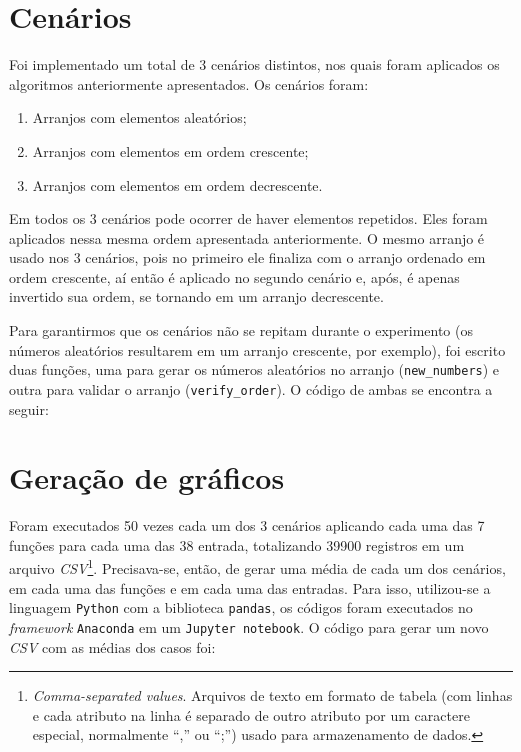 \section{Cenários}
Foi implementado um total de 3 cenários distintos, nos quais foram aplicados os algoritmos anteriormente apresentados. Os cenários foram:

\begin{enumerate}
	\item Arranjos com elementos aleatórios;
	\item Arranjos com elementos em ordem crescente;
	\item Arranjos com elementos em ordem decrescente.
\end{enumerate}

Em todos os 3 cenários pode ocorrer de haver elementos repetidos. Eles foram aplicados nessa mesma ordem apresentada anteriormente. O mesmo arranjo é usado nos 3 cenários, pois no primeiro ele finaliza com o arranjo ordenado em ordem crescente, aí então é aplicado no segundo cenário e, após, é apenas invertido sua ordem, se tornando em um arranjo decrescente.

Para garantirmos que os cenários não se repitam durante o experimento (os números aleatórios resultarem em um arranjo crescente, por exemplo), foi escrito duas funções, uma para gerar os números aleatórios no arranjo (\texttt{new\_numbers}) e outra para validar o arranjo (\texttt{verify\_order}). O código de ambas se encontra a seguir:



\section{Geração de gráficos}
Foram executados 50 vezes cada um dos 3 cenários aplicando cada uma das 7 funções para cada uma das 38 entrada, totalizando 39900 registros em um arquivo \textit{CSV}\footnote{\textit{Comma-separated values}. Arquivos de texto em formato de tabela (com linhas e cada atributo na linha é separado de outro atributo por um caractere especial, normalmente ``,'' ou ``;'') usado para armazenamento de dados.}. Precisava-se, então, de gerar uma média de cada um dos cenários, em cada uma das funções e em cada uma das entradas. Para isso, utilizou-se a linguagem \texttt{Python} com a biblioteca \texttt{pandas}, os códigos foram executados no \textit{framework} \texttt{Anaconda} em um \texttt{Jupyter notebook}. O código para gerar um novo \textit{CSV} com as médias dos casos foi:


